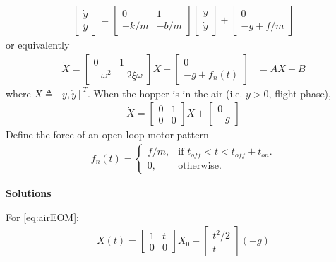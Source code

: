 \begin{align}
\begin{bmatrix}
\dot y  \\
\ddot y 
\end{bmatrix} = \begin{bmatrix}
0 & 1 \\
-k/m & -b/m
\end{bmatrix}\begin{bmatrix}
 y  \\
\dot y 
\end{bmatrix} + 
\begin{bmatrix}
0  \\
-g+f/m 
\end{bmatrix}
\end{align}
or equivalently
\begin{align}
\label{eq:groundEOM}
\dot X = \begin{bmatrix}
0 & 1 \\
-\omega^2 & -2\xi\omega
\end{bmatrix}X + 
\begin{bmatrix}
0  \\
-g+f_n(t)
\end{bmatrix} &= AX+B
\end{align}
where $X \triangleq [y,\dot y]^T$.
When the hopper is in the air (i.e. $y> 0$, flight phase), 
\begin{align}
\label{eq:airEOM}
\dot X = \begin{bmatrix}
0 & 1 \\
0 & 0
\end{bmatrix}X + 
\begin{bmatrix}
0  \\
-g 
\end{bmatrix}
\end{align}
\noindent Define the force  of an open-loop motor pattern
\begin{align}
 f_n(t)=\begin{cases}
    f/m, & \text{if $t_{off}<t<t_{off}+t_{on}$}.\\
    0, & \text{otherwise}.
  \end{cases}
\end{align}

\noindent\textbf{Solutions}

For \eqref{eq:airEOM}:
\begin{align}
\label{eq:airEOMsol}
X(t) = \begin{bmatrix}
1 & t \\
0 & 0
\end{bmatrix}X_0 + 
\begin{bmatrix}
t^2/2  \\
 t
\end{bmatrix}(-g)
\end{align}

